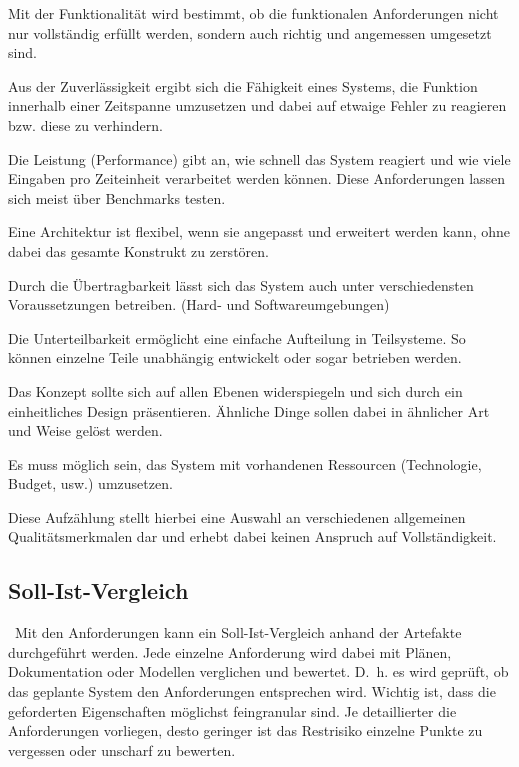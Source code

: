 \begin{description}[leftmargin=!,labelwidth=\widthof{\bfseries Konzeptuelle Integrität}]
	\item[Funktionalität] 
	Mit der Funktionalität wird bestimmt, ob die funktionalen Anforderungen nicht nur vollständig erfüllt werden, sondern auch richtig und angemessen umgesetzt sind.
	\item[Zuverlässigkeit] 
	Aus der Zuverlässigkeit ergibt sich die Fähigkeit eines Systems, die Funktion innerhalb einer Zeitspanne umzusetzen und
	dabei auf etwaige Fehler zu reagieren bzw. diese zu verhindern.
	\item[Leistung] 
	Die Leistung (Performance) gibt an, wie schnell das System reagiert und wie viele Eingaben pro Zeiteinheit verarbeitet werden können. Diese Anforderungen
	lassen sich meist über Benchmarks testen.
	\item[Flexibilität] 
	Eine Architektur ist flexibel, wenn sie angepasst und erweitert werden kann, ohne dabei das gesamte Konstrukt zu zerstören.
	\item[Übertragbarkeit] 
	Durch die Übertragbarkeit lässt sich das System auch unter verschiedensten Voraussetzungen betreiben. (Hard- und Softwareumgebungen) 
	\item[Unterteilbarkeit]
	Die Unterteilbarkeit ermöglicht eine einfache Aufteilung in Teilsysteme. So können einzelne Teile unabhängig entwickelt oder sogar betrieben werden.
	\item[Konzeptuelle Integrität] 
	Das Konzept sollte sich auf allen Ebenen widerspiegeln und sich durch ein einheitliches Design präsentieren. Ähnliche Dinge sollen dabei in ähnlicher Art und Weise gelöst werden. 
	\item[Machbarkeit] 
	Es muss möglich sein, das System mit vorhandenen Ressourcen (Technologie, Budget, usw.) umzusetzen.
\end{description}

Diese Aufzählung stellt hierbei eine Auswahl an verschiedenen allgemeinen Qualitäts\-merkmalen dar und erhebt dabei keinen Anspruch auf Vollständigkeit.

\subsection{Soll-Ist-Vergleich}
\
Mit den Anforderungen kann ein Soll-Ist-Vergleich anhand der Artefakte durchgeführt werden. Jede einzelne Anforderung wird dabei mit Plänen, Dokumentation oder Modellen verglichen und bewertet. D.~h. es wird geprüft, ob das geplante System den Anforderungen entsprechen wird. Wichtig ist, dass die geforderten Eigenschaften möglichst feingranular sind. Je detaillierter die Anforderungen vorliegen, desto geringer ist das Restrisiko einzelne Punkte zu vergessen oder unscharf zu bewerten.
  
